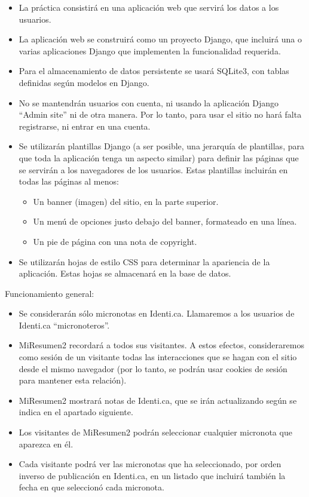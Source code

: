 \begin{itemize}
\item La práctica consistirá en una aplicación web que servirá los datos a los usuarios.

\item La aplicación web se construirá como un proyecto Django, que incluirá una o varias aplicaciones Django que implementen la funcionalidad requerida.

\item Para el almacenamiento de datos persistente se usará SQLite3, con tablas definidas según modelos en Django.

\item No se mantendrán usuarios con cuenta, ni usando la aplicación Django ``Admin site'' ni de otra manera. Por lo tanto, para usar el sitio no hará falta registrarse, ni entrar en una cuenta.

\item Se utilizarán plantillas Django (a ser posible, una jerarquía de plantillas, para que toda la aplicación tenga un aspecto similar) para definir las páginas que se servirán a los navegadores de los usuarios. Estas plantillas incluirán en todas las páginas al menos:
  \begin{itemize}
  \item Un banner (imagen) del sitio, en la parte superior.
  \item Un menú de opciones justo debajo del banner, formateado en una línea.
  \item Un pie de página con una nota de copyright.
  \end{itemize}

\item Se utilizarán hojas de estilo CSS para determinar la apariencia de la aplicación. Estas hojas se almacenará en la base de datos.
\end{itemize}

Funcionamiento general:

\begin{itemize}
\item Se considerarán sólo micronotas en Identi.ca. Llamaremos a los usuarios de Identi.ca ``micronoteros''.
\item MiResumen2 recordará a todos sus visitantes. A estos efectos, consideraremos como sesión de un visitante todas las interacciones que se hagan con el sitio desde el mismo navegador (por lo tanto, se podrán usar cookies de sesión para mantener esta relación).
\item MiResumen2 mostrará notas de Identi.ca, que se irán actualizando según se indica en el apartado siguiente.
\item Los visitantes de MiResumen2 podrán seleccionar cualquier micronota que aparezca en él.
\item Cada visitante podrá ver las micronotas que ha seleccionado, por orden inverso de publicación en Identi.ca, en un listado que incluirá también la fecha en que seleccionó cada micronota.
\end{itemize}

